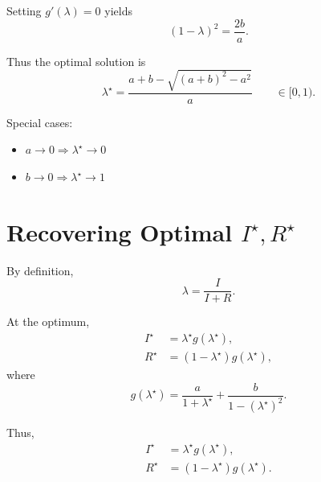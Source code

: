 \documentclass[11pt]{article}
\begin{document}
Setting \(g'(\lambda)=0\) yields
\begin{equation}
(1-\lambda)^2 = \frac{2b}{a}.
\end{equation}

Thus the optimal solution is
\begin{equation}
\boxed{
\lambda^\star
= \frac{a + b - \sqrt{(a+b)^2 - a^2}}{a}
}
\qquad \in [0,1).
\end{equation}

Special cases:
\begin{itemize}
\item \(a \to 0 \Rightarrow \lambda^\star \to 0\)
\item \(b \to 0 \Rightarrow \lambda^\star \to 1\)
\end{itemize}

\section{Recovering Optimal \(I^\star, R^\star\)}

By definition,
\begin{equation}
\lambda = \frac{I}{I+R}.
\end{equation}

At the optimum,
\begin{align}
I^\star &= \lambda^\star g(\lambda^\star), \\
R^\star &= (1-\lambda^\star) g(\lambda^\star),
\end{align}
where
\begin{equation}
g(\lambda^\star)
= \frac{a}{1+\lambda^\star}
+ \frac{b}{1-(\lambda^\star)^2}.
\end{equation}

Thus,
\begin{equation}
\boxed{
\begin{aligned}
I^\star &= \lambda^\star g(\lambda^\star), \\
R^\star &= (1-\lambda^\star) g(\lambda^\star).
\end{aligned}
}
\end{equation}
\end{document}
